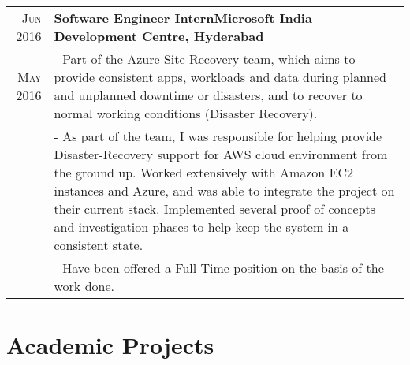 \documentclass[a4paper,10pt]{extarticle} %
\begin{document}
\begin{tabular}{r|p{17cm}}

\textsc{Jun 2016} & \textbf{Software Engineer Intern}\hfill\textbf{Microsoft India Development Centre, Hyderabad}\\
\textsc{May 2016}& \footnotesize{- Part of the Azure Site Recovery team, which aims to provide consistent apps, workloads and data during planned and unplanned downtime or disasters, and to recover to normal working conditions (Disaster Recovery).}\\
& \footnotesize{- As part of the team, I was responsible for helping provide Disaster-Recovery support for AWS cloud environment from the ground up. Worked extensively with Amazon EC2 instances and Azure, and was able to integrate the project on their current stack. Implemented several proof of concepts and investigation phases to help keep the system in a consistent state.}\\
& \footnotesize{- Have been offered a Full-Time position on the basis of the work done. }\\
\end{tabular}

\section{Academic Projects}
\end{document}
